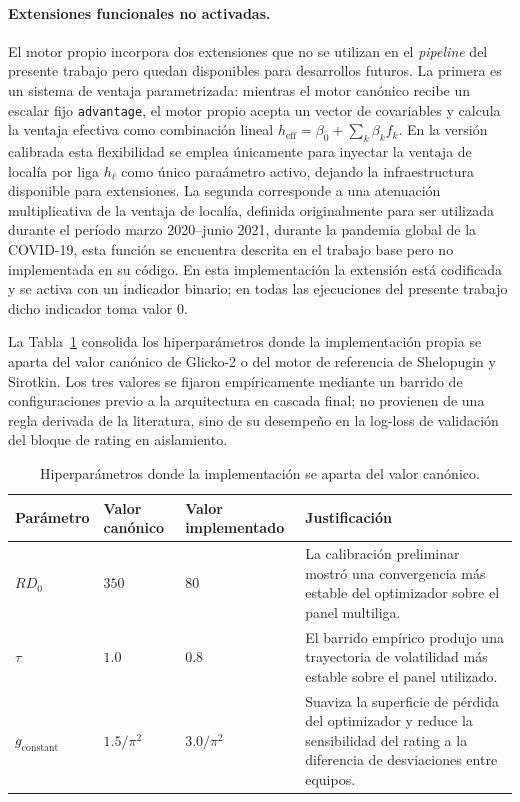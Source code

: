 \paragraph{Extensiones funcionales no activadas.} El motor propio incorpora dos extensiones que no se utilizan en el \textit{pipeline} del presente trabajo pero quedan disponibles para desarrollos futuros. La primera es un sistema de ventaja parametrizada: mientras el motor can\'onico recibe un escalar fijo \texttt{advantage}, el motor propio acepta un vector de covariables y calcula la ventaja efectiva como combinaci\'on lineal $h_{\text{eff}} = \beta_0 + \sum_k \beta_k f_k$. En la versi\'on calibrada esta flexibilidad se emplea \'unicamente para inyectar la ventaja de local\'ia por liga $h_\ell$ como \'unico para\'ametro activo, dejando la infraestructura disponible para extensiones. La segunda corresponde a una atenuaci\'on multiplicativa de la ventaja de local\'ia, definida originalmente para ser utilizada durante el per\'iodo marzo 2020--junio 2021, durante la pandemia global de la COVID-19, esta funci\'on se encuentra descrita en el trabajo base pero no implementada en su c\'odigo. En esta implementaci\'on la extensi\'on est\'a codificada y se activa con un indicador binario; en todas las ejecuciones del presente trabajo dicho indicador toma valor $0$.

La Tabla~\ref{tab:constantes_divergentes} consolida los hiperpar\'ametros donde la implementaci\'on propia se aparta del valor can\'onico de Glicko-2 o del motor de referencia de Shelopugin y Sirotkin. Los tres valores se fijaron emp\'iricamente mediante un barrido de configuraciones previo a la arquitectura en cascada final; no provienen de una regla derivada de la literatura, sino de su desempe\~no en la log-loss de validaci\'on del bloque de rating en aislamiento.

\begin{table}[htbp]
	\centering
	\caption{Hiperpar\'ametros donde la implementaci\'on se aparta del valor can\'onico.}
	\label{tab:constantes_divergentes}
	\small
	\begin{tabular}{p{2.8cm} p{2.6cm} p{2.6cm} p{6.4cm}}
		\toprule
		\textbf{Par\'ametro} & \textbf{Valor can\'onico} & \textbf{Valor implementado} & \textbf{Justificaci\'on} \\
		\midrule
		$RD_0$ & $350$ & $80$ & La calibraci\'on preliminar mostr\'o una convergencia m\'as estable del optimizador sobre el panel multiliga. \\
		$\tau$ & $1{.}0$ & $0{.}8$ & El barrido emp\'irico produjo una trayectoria de volatilidad m\'as estable sobre el panel utilizado. \\
		$g_{\text{constant}}$ & $1{.}5/\pi^2$ & $3{.}0/\pi^2$ & Suaviza la superficie de p\'erdida del optimizador y reduce la sensibilidad del rating a la diferencia de desviaciones entre equipos. \\
		\bottomrule
	\end{tabular}
\end{table}


